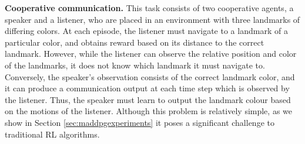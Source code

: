 \documentclass{article}
\begin{document}


\textbf{Cooperative communication.} This task consists of two cooperative agents, a speaker and a listener, who are placed in an environment with three landmarks of differing colors. At each episode, the listener must navigate to a landmark of a particular color, and obtains reward based on its distance to the correct landmark. However, while the listener can observe the relative position and color of the landmarks, it does not know which landmark it must navigate to. Conversely, the speaker's observation consists of the correct landmark color, and it can produce a communication output at each time step which is observed by the listener. Thus, the speaker must learn to output the landmark colour based on the motions of the listener. 
Although this problem is relatively simple, as we show in Section \ref{sec:maddpgexperiments} it poses a significant challenge to traditional RL algorithms.
\end{document}
